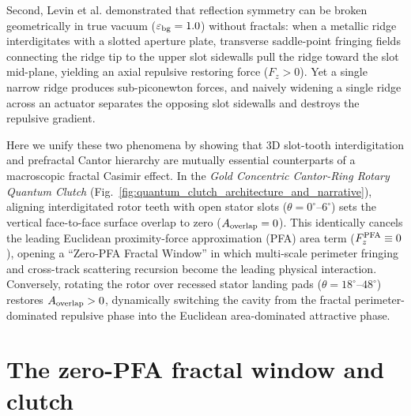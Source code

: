 \documentclass[11pt,letterpaper]{article}
\begin{document}
Second, Levin et al.\cite{levin2010} demonstrated that reflection symmetry can be broken geometrically in true vacuum ($\varepsilon_{\rm bg}=1.0$) without fractals: when a metallic ridge interdigitates with a slotted aperture plate, transverse saddle-point fringing fields connecting the ridge tip to the upper slot sidewalls pull the ridge toward the slot mid-plane, yielding an axial repulsive restoring force ($F_z > 0$)\cite{levin2010,rodriguez2011}. Yet a single narrow ridge produces sub-piconewton forces, and naively widening a single ridge across an actuator separates the opposing slot sidewalls and destroys the repulsive gradient.

Here we unify these two phenomena by showing that 3D slot-tooth interdigitation and prefractal Cantor hierarchy are mutually essential counterparts of a macroscopic fractal Casimir effect. In the \emph{Gold Concentric Cantor-Ring Rotary Quantum Clutch} (Fig.~\ref{fig:quantum_clutch_architecture_and_narrative}), aligning interdigitated rotor teeth with open stator slots ($\theta = 0^\circ\text{--}6^\circ$) sets the vertical face-to-face surface overlap to zero ($A_{\rm overlap} = 0$). This identically cancels the leading Euclidean proximity-force approximation (PFA) area term ($F_z^{\rm PFA} \equiv 0$), opening a ``Zero-PFA Fractal Window'' in which multi-scale perimeter fringing and cross-track scattering recursion become the leading physical interaction. Conversely, rotating the rotor over recessed stator landing pads ($\theta = 18^\circ\text{--}48^\circ$) restores $A_{\rm overlap} > 0$, dynamically switching the cavity from the fractal perimeter-dominated repulsive phase into the Euclidean area-dominated attractive phase.

\section*{The zero-PFA fractal window and clutch}
\label{sec:architecture}
\end{document}

